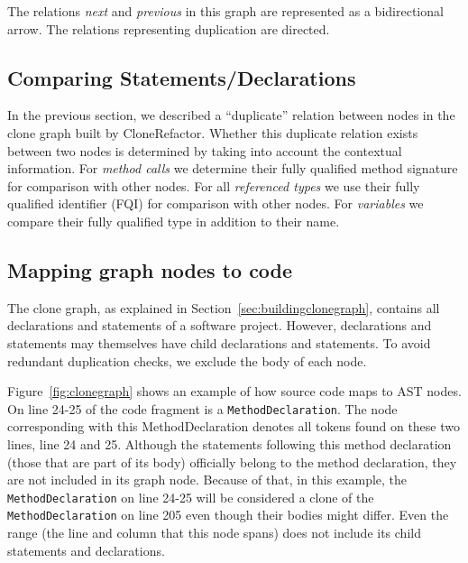 \documentclass[conference]{IEEEtran}
\begin{document}

The relations \textit{next} and \textit{previous} in this graph are represented as a bidirectional arrow. The relations representing duplication are directed. %

\subsection{Comparing Statements/Declarations} \label{sec:comparingstuff}
In the previous section, we described a ``duplicate'' relation between nodes in the clone graph built by CloneRefactor. Whether this duplicate relation exists between two nodes is determined by taking into account the contextual information. For \textit{method calls} we determine their fully qualified method signature for comparison with other nodes. For all \textit{referenced types} we use their fully qualified identifier (FQI) for comparison with other nodes. For \textit{variables} we compare their fully qualified type in addition to their name.

\subsection{Mapping graph nodes to code}
The clone graph, as explained in Section~\ref{sec:buildingclonegraph}, contains all declarations and statements of a software project. However, declarations and statements may themselves have child declarations and statements. To avoid redundant duplication checks, we exclude the body of each node.

Figure~\ref{fig:clonegraph} shows an example of how source code maps to AST nodes. On line 24-25 of the code fragment is a \texttt{MethodDeclaration}. The node corresponding with this MethodDeclaration denotes all tokens found on these two lines, line 24 and 25. Although the statements following this method declaration (those that are part of its body) officially belong to the method declaration, they are not included in its graph node. Because of that, in this example, the \texttt{MethodDeclaration} on line 24-25 will be considered a clone of the \texttt{MethodDeclaration} on line 205 even though their bodies might differ. Even the range (the line and column that this node spans) does not include its child statements and declarations.
\end{document}

